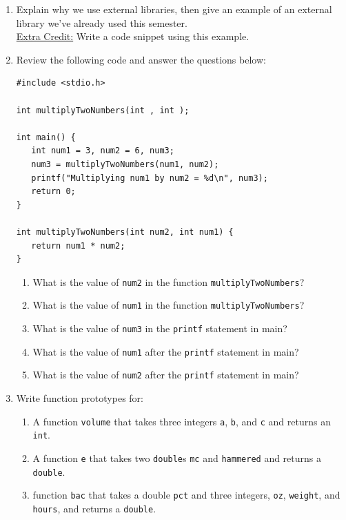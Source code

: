 \documentclass[letter,11pt]{article}
\begin{document}
\begin{enumerate}
    \item Explain why we use external libraries, then give an example of an external library we've already used this semester. \\
    \underline{Extra Credit:} Write a code snippet using this example.
    
    \item Review the following code and answer the questions below:
    \begin{verbatim}
#include <stdio.h>

int multiplyTwoNumbers(int , int );

int main() {
   int num1 = 3, num2 = 6, num3;
   num3 = multiplyTwoNumbers(num1, num2);
   printf("Multiplying num1 by num2 = %d\n", num3);
   return 0;
}

int multiplyTwoNumbers(int num2, int num1) {
   return num1 * num2;
}
    \end{verbatim}
    \begin{enumerate}
        \item What is the value of \texttt{num2} in the function \texttt{multiplyTwoNumbers}?
        \item What is the value of \texttt{num1} in the function \texttt{multiplyTwoNumbers}?
        \item What is the value of \texttt{num3} in the \texttt{printf} statement in main?
        \item What is the value of \texttt{num1} after the \texttt{printf} statement in main?
        \item What is the value of \texttt{num2} after the \texttt{printf} statement in main?
    \end{enumerate}
    
    \item Write function prototypes for:
    \begin{enumerate}
        \item A function \texttt{volume} that takes three integers \texttt{a}, \texttt{b}, and \texttt{c} and returns an \texttt{int}.
        \item A function \texttt{e} that takes two \texttt{double}s \texttt{mc} and \texttt{hammered} and returns a \texttt{double}.
        \item function \texttt{bac} that takes a double \texttt{pct} and three integers, \texttt{oz}, \texttt{weight}, and \texttt{hours}, and returns a \texttt{double}.
    \end{enumerate}
    

\end{enumerate}
\end{document}
